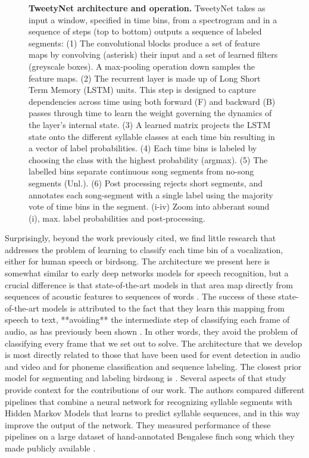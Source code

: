 \documentclass[10pt,letterpaper]{article}
\begin{document}
\begin{figure}[!ht]
{\caption{{\bf TweetyNet architecture and operation.}
TweetyNet takes as input a window, 
specified in time bins, from a spectrogram and in a sequence of steps (top to bottom) outputs a sequence of labeled segments:
(1) The convolutional blocks produce a set of feature maps 
by convolving (asterisk) their input and a set of learned filters (greyscale boxes). 
A max-pooling operation down samples the feature maps.
(2) The recurrent layer is made up of Long Short Term Memory (LSTM) units. 
This step is designed to capture dependencies across time 
using both forward (F) and backward (B) passes through time to learn the weight governing the dynamics of the layer's internal state. 
(3) A learned matrix projects the LSTM state onto the different syllable classes at each time bin 
resulting in a vector of label probabilities.
(4) Each time bins is labeled by choosing the class with the highest probability (argmax).
(5) The labelled bins separate continuous song segments from no-song segments (Unl.).  
(6) Post processing rejects short segments, and annotates each song-segment with a single label using the majority vote of time bins in the segment.
(i-iv) Zoom into abberant sound (i), max. label probabilities and post-processing.}
\label{fig_tweetynet_architecture}}
\end{figure}

Surprisingly, beyond the work previously cited, we find little research that addresses the problem of learning to classify each time bin of a vocalization, either for human speech or birdsong.
The architecture we present here is somewhat similar to early deep networks models for speech recognition, 
but a crucial difference is that state-of-the-art models in that area 
map directly from sequences of acoustic features to sequences of words \cite{graves2006connectionist}.
The success of these state-of-the-art models is attributed to the fact that they learn this mapping from speech to text, **avoiding** the intermediate step of classifying each frame of audio, as has previously been shown \cite{graves_supervised_2012}.
In other words, they avoid the problem of classifying every frame that we set out to solve.
The architecture that we develop is most directly related to those that have been used for event 
detection in audio and video \cite{bock_polyphonic_2012-1,parascandolo_recurrent_2016} 
and for phoneme classification and sequence labeling\cite{graves_framewise_2005,graves_supervised_2012}.
The closest prior model for segmenting and labeling birdsong is \cite{koumura_automatic_2016-1}. 
Several aspects of that study provide context for the contributions of our work. 
The authors compared different pipelines that combine a neural network for recognizing syllable 
segments with Hidden Markov Models that learns to predict syllable sequences, and in this way 
improve the output of the network. They measured performance of these pipelines on a large dataset of 
hand-annotated Bengalese finch song which they made publicly available \cite{koumura_birdsongrecognition_2016}.
\end{document}
